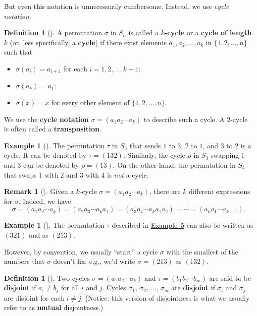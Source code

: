 \documentclass[10pt,openany,oneside]{book}
\newcommand{\terminology}[1]{\textbf{#1}}
\theoremstyle{plain}
\theoremstyle{definition}
\newtheorem{definition}[theorem]{Definition}
\theoremstyle{definition}
\newtheorem{remark}[theorem]{Remark}
\theoremstyle{definition}
\newtheorem{example}[theorem]{Example}
\theoremstyle{definition}
\numberwithin{equation}{section}
\begin{document}
But even this notation is unnecessarily cumbersome. Instead, we use \emph{cycle notation}.%
\begin{definition}[{}]\label{definition-46}
A permutation \(\sigma\) in \(S_n\) is called a \terminology{\(k\)-cycle} or a \terminology{cycle of length \(k\)} (or, less specifically, a \terminology{cycle}) if there exist elements \(a_1,
a_2,\ldots, a_k\) in \(\{1,2,\ldots,n\}\) such that \leavevmode%
\begin{itemize}[label=\textbullet]
\item{}\(\sigma(a_i)=a_{i+1}\) for each \(i=1,2,\ldots, k-1\);%
\item{}\(\sigma(a_k)=a_1\);%
\item{}\(\sigma(x)=x\) for every other element of \(\{1,2,\ldots, n\}\).%
\end{itemize}
%
\par
We use the \terminology{cycle notation} \(\sigma = (a_1 a_2 \cdots a_k)\) to describe such a cycle. A \(2\)-cycle is often called a \terminology{transposition}.%
\end{definition}
\begin{example}[]\label{tr}
The permutation \(\tau\) in \(S_3\) that sends \(1\) to \(3\), \(2\) to \(1\), and \(3\) to \(2\) is a cycle. It can be denoted by \(\tau =(132)\). Similarly, the cycle \(\rho\) in \(S_3\) swapping \(1\) and \(3\) can be denoted by \(\rho=(13)\). On the other hand, the permutation in \(S_4\) that swaps \(1\) with \(2\) and \(3\) with \(4\) is \emph{not} a cycle.%
\end{example}
\begin{remark}[]\label{remark-27}
Given a \(k\)-cycle \(\sigma=(a_1 a_2\cdots a_k)\), there are \(k\) different expressions for \(\sigma\). Indeed, we have%
\begin{equation*}
\sigma=(a_1 a_2\cdots a_k)=(a_2 a_3 \cdots a_k a_1)=(a_3 a_4 \cdots a_k a_1 a_2)=\cdots = (a_k a_1 \cdots a_{k-1}).
\end{equation*}
%
\end{remark}
\begin{example}[]\label{example-51}
The permutation \(\tau\) described in \hyperref[tr]{Example~5} can also be written as \((321)\) and as \((213)\).%
\end{example}
However, by convention, we usually ``start'' a cycle \(\sigma\) with the smallest of the numbers that \(\sigma\) doesn't fix: e.g., we'd write \(\sigma=(213)\) as \((132)\).%
\begin{definition}[{}]\label{definition-47}
Two cycles \(\sigma=(a_1 a_2 \cdots a_k)\) and \(\tau=(b_1
b_2 \cdots b_m)\) are said to be \terminology{disjoint} if \(a_i \neq
b_j\) for all \(i\) and \(j\). Cycles \(\sigma_1\), \(\sigma_2\), \(\ldots\), \(\sigma_m\) are \terminology{disjoint} if \(\sigma_i\) and \(\sigma_j\) are disjoint for each \(i \neq j\). (Notice: this version of disjointness is what we usually refer to as \terminology{mutual} disjointness.)%
\end{definition}
\end{document}

